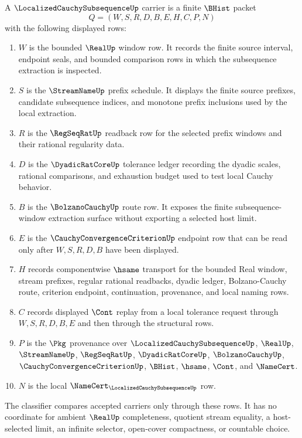 \begin{definition}
\label{def:localized-cauchy-subsequence-carrier}
A $\LocalizedCauchySubsequenceUp$ carrier is a finite $\BHist$ packet
$$
Q=(W,S,R,D,B,E,H,C,P,N)
$$
with the following displayed rows:
\begin{enumerate}
\item $W$ is the bounded $\RealUp$ window row. It records the finite source interval, endpoint seals, and bounded comparison rows in which the subsequence extraction is inspected.
\item $S$ is the $\StreamNameUp$ prefix schedule. It displays the finite source prefixes, candidate subsequence indices, and monotone prefix inclusions used by the local extraction.
\item $R$ is the $\RegSeqRatUp$ readback row for the selected prefix windows and their rational regularity data.
\item $D$ is the $\DyadicRatCoreUp$ tolerance ledger recording the dyadic scales, rational comparisons, and exhaustion budget used to test local Cauchy behavior.
\item $B$ is the $\BolzanoCauchyUp$ route row. It exposes the finite subsequence-window extraction surface without exporting a selected host limit.
\item $E$ is the $\CauchyConvergenceCriterionUp$ endpoint row that can be read only after $W,S,R,D,B$ have been displayed.
\item $H$ records componentwise $\hsame$ transport for the bounded Real window, stream prefixes, regular rational readbacks, dyadic ledger, Bolzano-Cauchy route, criterion endpoint, continuation, provenance, and local naming rows.
\item $C$ records displayed $\Cont$ replay from a local tolerance request through $W,S,R,D,B,E$ and then through the structural rows.
\item $P$ is the $\Pkg$ provenance over $\LocalizedCauchySubsequenceUp$, $\RealUp$, $\StreamNameUp$, $\RegSeqRatUp$, $\DyadicRatCoreUp$, $\BolzanoCauchyUp$, $\CauchyConvergenceCriterionUp$, $\BHist$, $\hsame$, $\Cont$, and $\NameCert$.
\item $N$ is the local $\NameCert_{\LocalizedCauchySubsequenceUp}$ row.
\end{enumerate}
The classifier compares accepted carriers only through these rows. It has no coordinate for ambient $\RealUp$ completeness, quotient stream equality, a host-selected limit, an infinite selector, open-cover compactness, or countable choice.
\end{definition}


